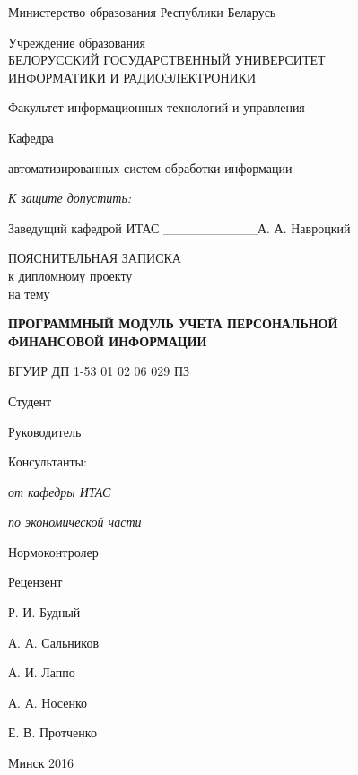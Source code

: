 \thispagestyle{empty}
\setlength{\parindent}{0ex} %

{\centering{}
  Министерство образования Республики Беларусь\par
}

\bigskip
{\centering{}
  Учреждение образования \\
  БЕЛОРУССКИЙ ГОСУДАРСТВЕННЫЙ УНИВЕРСИТЕТ \\
  ИНФОРМАТИКИ И РАДИОЭЛЕКТРОНИКИ\par
}

\bigskip
Факультет
информационных технологий и управления

\smallskip
\parbox{\widthof{Факультет}}{Кафедра}
автоматизированных систем обработки информации

\vspace{\baselineskip}
\hfill
\begin{minipage}{.4\textwidth}
  {\raggedright{}
    \textit{К защите допустить:}

    \smallskip
    Заведущий кафедрой ИТАС
    \_\_\_\_\_\_\_\_\_\_А. А. Навроцкий\par
  }
\end{minipage}

\vspace{2\baselineskip}

{\centering{}
  ПОЯСНИТЕЛЬНАЯ ЗАПИСКА \\
  к дипломному проекту \\
  на тему\par
}

\bigskip
{\centering{}
  \textbf{ПРОГРАММНЫЙ МОДУЛЬ УЧЕТА ПЕРСОНАЛЬНОЙ \\ ФИНАНСОВОЙ ИНФОРМАЦИИ}\par
}

\bigskip
{\centering{}
  БГУИР ДП 1-53 01 02 06 029 ПЗ\par
}

\vspace{\baselineskip}

\begin{minipage}{.6\textwidth}
Студент

Руководитель

Консультанты:

\hspace{0.3em} \textit{от кафедры ИТАС}

\hspace{0.3em} \textit{по экономической части}

Нормоконтролер

Рецензент
\end{minipage}
\hfill
\begin{minipage}{.3\textwidth}
  Р. И. Будный

  А. А. Сальников

  \vspace{\baselineskip}
  А. И. Лаппо

  А. А. Носенко

  Е. В. Протченко

  \color{red}{???}
\end{minipage}

\vfill

{\centering{}
  Минск 2016\par
}

\setlength{\parindent}{1.25cm} %
